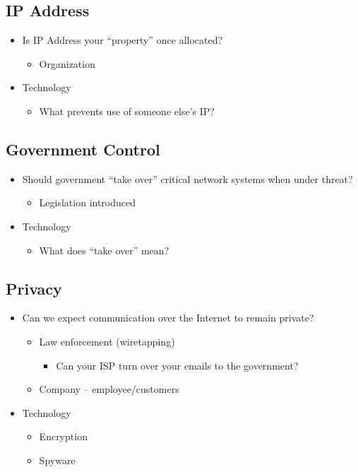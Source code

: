 \subsection{IP Address}
\begin{itemize}[nosep]
    \item Is IP Address your ``property'' once allocated?
          \begin{itemize}[nosep]
              \item Organization
          \end{itemize}
    \item Technology
          \begin{itemize}[nosep]
              \item What prevents use of someone else's IP?
          \end{itemize}
\end{itemize}

\subsection{Government Control}
\begin{itemize}[nosep]
    \item Should government ``take over'' critical network systems when under threat?
          \begin{itemize}[nosep]
              \item Legislation introduced
          \end{itemize}
    \item Technology
          \begin{itemize}[nosep]
              \item What does ``take over'' mean?
          \end{itemize}
\end{itemize}

\subsection{Privacy}
\begin{itemize}[nosep]
    \item Can we expect communication over the Internet to remain private?
          \begin{itemize}[nosep]
              \item Law enforcement (wiretapping)
                    \begin{itemize}[nosep]
                        \item Can your ISP turn over your emails to the government?
                    \end{itemize}
              \item Company -- employee/customers
          \end{itemize}
    \item Technology
          \begin{itemize}[nosep]
              \item Encryption
              \item Spyware
          \end{itemize}
\end{itemize}

